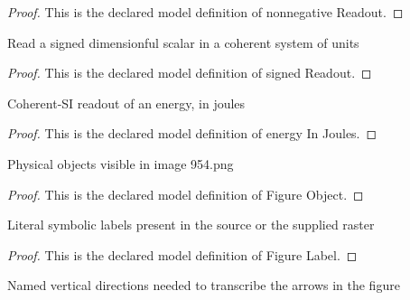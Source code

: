 \begin{proof}
  This is the declared model definition of nonnegative Readout.
\end{proof}
\begin{definition}
  \label{def:physics:phyx-mini-0954:phyxminiproblems-problemphyxmini0954-signedreadout}
  Read a signed dimensionful scalar in a coherent system of units
\end{definition}
\begin{proof}
  This is the declared model definition of signed Readout.
\end{proof}
\begin{definition}
  \label{def:physics:phyx-mini-0954:phyxminiproblems-problemphyxmini0954-energyinjoules}
  Coherent-SI readout of an energy, in joules
\end{definition}
\begin{proof}
  This is the declared model definition of energy In Joules.
\end{proof}
\begin{definition}
  \label{def:physics:phyx-mini-0954:phyxminiproblems-problemphyxmini0954-figureobject}
  Physical objects visible in image 954.png
\end{definition}
\begin{proof}
  This is the declared model definition of Figure Object.
\end{proof}
\begin{definition}
  \label{def:physics:phyx-mini-0954:phyxminiproblems-problemphyxmini0954-figurelabel}
  Literal symbolic labels present in the source or the supplied raster
\end{definition}
\begin{proof}
  This is the declared model definition of Figure Label.
\end{proof}
\begin{definition}
  \label{def:physics:phyx-mini-0954:phyxminiproblems-problemphyxmini0954-verticaldirection}
  Named vertical directions needed to transcribe the arrows in the figure
\end{definition}
